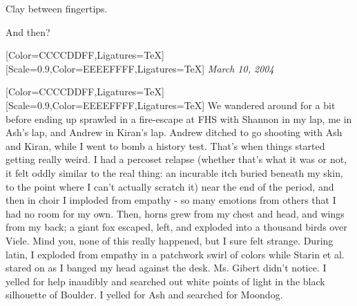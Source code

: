 \begin{paracol}{2}
\begin{leftcolumn}
\begin{ally}
Clay between fingertips.
\end{ally}
And then?
\newpage
\end{leftcolumn}
\begin{rightcolumn*}
\begin{flushright}
  [Color=CCCCDDFF,Ligatures=TeX]
  \renewfontfamily{}[Scale=0.9,Color=EEEEFFFF,Ligatures=TeX]
    \emph{March 10, 2004}
\end{flushright}
\end{rightcolumn*}
\begin{leftcolumn}
  [Color=CCCCDDFF,Ligatures=TeX]
  \renewfontfamily{}[Scale=0.9,Color=EEEEFFFF,Ligatures=TeX]
\noindent We wandered around for a bit before ending up sprawled in a fire-escape at FHS with Shannon in my lap, me in Ash's lap, and Andrew in Kiran's lap. Andrew ditched to go shooting with Ash and Kiran, while I went to bomb a history test. That's when things started getting really weird. I had a percoset relapse (whether that's what it was or not, it felt oddly similar to the real thing: an incurable itch buried beneath my skin, to the point where I can't actually scratch it) near the end of the period, and then in choir I imploded from empathy - so many emotions from others that I had no room for my own. Then, horns grew from my chest and head, and wings from my back; a giant fox escaped, left, and exploded into a thousand birds over Viele. Mind you, none of this really happened, but I sure felt strange. During latin, I exploded from empathy in a patchwork swirl of colors while Starin et al. stared on as I banged my head against the desk. Ms. Gibert didn't notice. I yelled for help inaudibly and searched out white points of light in the black silhouette of Boulder. I yelled for Ash and searched for Moondog.


\end{leftcolumn}
\end{paracol}

